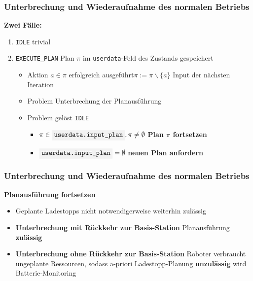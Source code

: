 \documentclass{beamer}
\newcommand{\code}[1]{\colorbox{light-gray}{\texttt{#1}}}
\begin{document}
\begin{frame}
  \frametitle{Unterbrechung und Wiederaufnahme des normalen Betriebs}
  \textbf{Zwei Fälle:}
  \begin{enumerate}
    \item \code{IDLE} \textrightarrow \thinspace trivial
    \item \code{EXECUTE\_PLAN} \textrightarrow \thinspace Plan $\pi$ im \code{userdata}-Feld des Zustands gespeichert
    \begin{itemize}
      \item Aktion $a \in \pi$ erfolgreich ausgeführt\newline \textrightarrow \thinspace $\pi := \pi \backslash \{a\}$ Input der nächsten Iteration
      \item Problem \textrightarrow \thinspace Unterbrechung der Planausführung
      \item Problem gelöst \textrightarrow \thinspace \code{IDLE} 
      \begin{itemize}
        \item $\pi \in \code{userdata.input\_plan}, \pi \neq \emptyset$ \textrightarrow \thinspace \textbf{Plan $\pi$ fortsetzen}
        \item $\code{userdata.input\_plan} = \emptyset$ \textrightarrow \thinspace \textbf{neuen Plan anfordern}
      \end{itemize}
    \end{itemize}
  \end{enumerate}
\end{frame}

\begin{frame}
  \frametitle{Unterbrechung und Wiederaufnahme des normalen Betriebs}
  \textbf{Planausführung fortsetzen}
  \begin{itemize}
    \item Geplante Ladestopps nicht notwendigerweise weiterhin zulässig
    \item \textbf{Unterbrechung mit Rückkehr zur Basis-Station} \textrightarrow \thinspace Planausführung \textbf{zulässig}
    \item \textbf{Unterbrechung ohne Rückkehr zur Basis-Station} \textrightarrow \thinspace Roboter verbraucht ungeplante Ressourcen, sodass a-priori Ladestopp-Planung
    \textbf{unzulässig} wird \textrightarrow \thinspace Batterie-Monitoring
  \end{itemize}
\end{frame}
\end{document}
